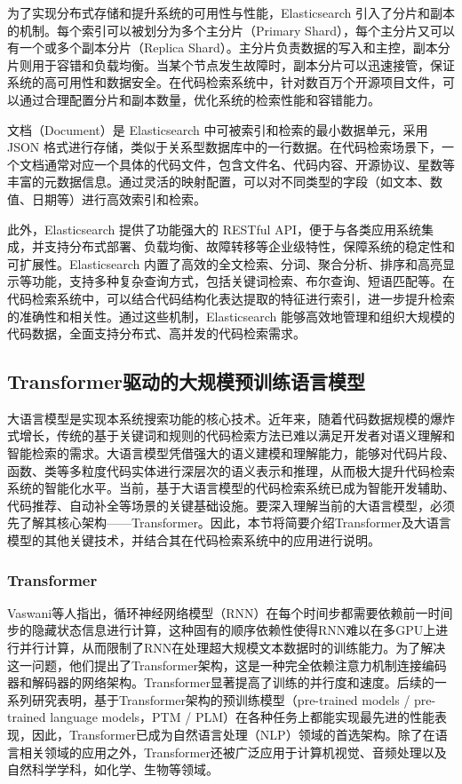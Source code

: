 \documentclass[UTF8,a4paper,12pt]{ctexart}
\numberwithin{equation}{section}
\begin{document}
为了实现分布式存储和提升系统的可用性与性能，Elasticsearch 引入了分片和副本的机制。每个索引可以被划分为多个主分片（Primary Shard），每个主分片又可以有一个或多个副本分片（Replica Shard）。主分片负责数据的写入和主控，副本分片则用于容错和负载均衡。当某个节点发生故障时，副本分片可以迅速接管，保证系统的高可用性和数据安全。在代码检索系统中，针对数百万个开源项目文件，可以通过合理配置分片和副本数量，优化系统的检索性能和容错能力。\par

文档（Document）是 Elasticsearch 中可被索引和检索的最小数据单元，采用 JSON 格式进行存储，类似于关系型数据库中的一行数据。在代码检索场景下，一个文档通常对应一个具体的代码文件，包含文件名、代码内容、开源协议、星数等丰富的元数据信息。通过灵活的映射配置，可以对不同类型的字段（如文本、数值、日期等）进行高效索引和检索。\par

此外，Elasticsearch 提供了功能强大的 RESTful API，便于与各类应用系统集成，并支持分布式部署、负载均衡、故障转移等企业级特性，保障系统的稳定性和可扩展性。Elasticsearch 内置了高效的全文检索、分词、聚合分析、排序和高亮显示等功能，支持多种复杂查询方式，包括关键词检索、布尔查询、短语匹配等。在代码检索系统中，可以结合代码结构化表达提取的特征进行索引，进一步提升检索的准确性和相关性。通过这些机制，Elasticsearch 能够高效地管理和组织大规模的代码数据，全面支持分布式、高并发的代码检索需求。\par
\subsection{Transformer驱动的大规模预训练语言模型}
大语言模型是实现本系统搜索功能的核心技术。近年来，随着代码数据规模的爆炸式增长，传统的基于关键词和规则的代码检索方法已难以满足开发者对语义理解和智能检索的需求。大语言模型凭借强大的语义建模和理解能力，能够对代码片段、函数、类等多粒度代码实体进行深层次的语义表示和推理，从而极大提升代码检索系统的智能化水平。当前，基于大语言模型的代码检索系统已成为智能开发辅助、代码推荐、自动补全等场景的关键基础设施。要深入理解当前的大语言模型，必须先了解其核心架构——Transformer。因此，本节将简要介绍Transformer及大语言模型的其他关键技术，并结合其在代码检索系统中的应用进行说明。

\subsubsection{Transformer}
Vaswani等人指出，循环神经网络模型（RNN）在每个时间步都需要依赖前一时间步的隐藏状态信息进行计算，这种固有的顺序依赖性使得RNN难以在多GPU上进行并行计算，从而限制了RNN在处理超大规模文本数据时的训练能力。为了解决这一问题，他们提出了Transformer架构，这是一种完全依赖注意力机制连接编码器和解码器的网络架构。Transformer显著提高了训练的并行度和速度。后续的一系列研究表明，基于Transformer架构的预训练模型（pre-trained models / pre-trained language models，PTM / PLM）在各种任务上都能实现最先进的性能表现，因此，Transformer已成为自然语言处理（NLP）领域的首选架构。除了在语言相关领域的应用之外，Transformer还被广泛应用于计算机视觉、音频处理以及自然科学学科，如化学、生物等领域。\par
\end{document}
